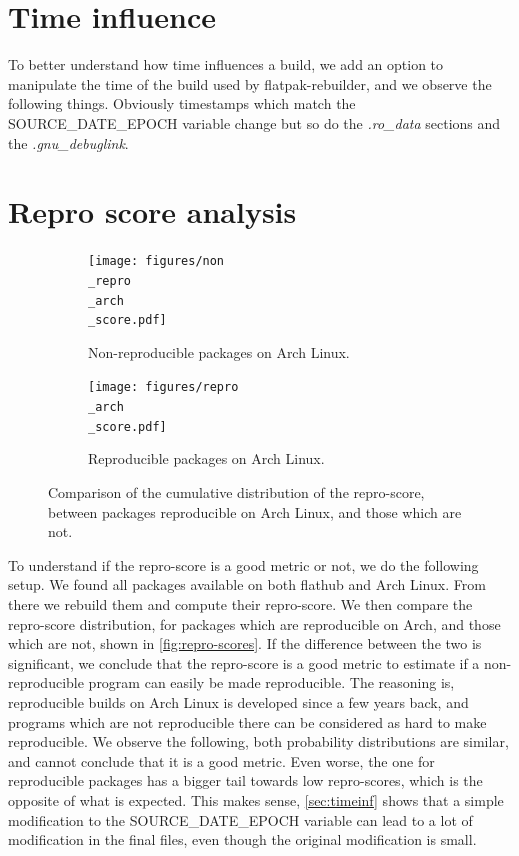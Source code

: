 \documentclass[a4paper,11pt,oneside]{report}
\theoremstyle{definition}
\newcommand{\sysname}{flatpak-rebuilder\xspace}
\newcommand{\rb}{reproducible builds\xspace}
\newcommand{\fh}{flathub\xspace}
\newcommand{\sde}{SOURCE\_DATE\_EPOCH\xspace}
\begin{document}
\section*{Time influence}
\label{sec:timeinf}
To better understand how time influences a build, we add an option to manipulate
the time of the build used by \sysname, and we observe the following things.
Obviously timestamps which match the \sde variable change but so do the
\emph{.ro\_data} sections and the \emph{.gnu\_debuglink}.

\section{Repro score analysis}

\begin{figure}[h]
\centering
\begin{subfigure}{.5\textwidth}
  \centering
  \texttt{[image: figures/non\\\_repro\\\_arch\\\_score.pdf]}
  \caption{Non-reproducible packages on Arch Linux.}
  \label{fig:sub1}
\end{subfigure}%
\begin{subfigure}{.5\textwidth}
  \centering
  \texttt{[image: figures/repro\\\_arch\\\_score.pdf]}
  \caption{Reproducible packages on Arch Linux.}
  \label{fig:sub2}
\end{subfigure}
\caption{Comparison of the cumulative distribution of the repro-score, between
    packages reproducible on Arch Linux, and those which are not.}
\label{fig:repro-scores}
\end{figure}

To understand if the repro-score is a good metric or not, we do the following
setup. We found all packages available on both \fh and Arch Linux. From there
we rebuild them and compute their repro-score. We then compare the repro-score
distribution, for packages which are reproducible on Arch, and those which are
not, shown in \autoref{fig:repro-scores}. If the difference between the two is
significant, we conclude that the repro-score is a good metric to estimate if a
non-reproducible program can easily be made reproducible. The reasoning is, \rb
on Arch Linux is developed since a few years back, and programs which are not
reproducible there can be considered as hard to make reproducible. We observe
the following, both probability distributions are similar, and cannot conclude
that it is a good metric. Even worse, the one for reproducible packages has a
bigger tail towards low repro-scores, which is the opposite of what is
expected.  This makes sense, \autoref{sec:timeinf} shows that a simple
modification to the \sde variable can lead to a lot of modification in the
final files, even though the original modification is small.
\end{document}
